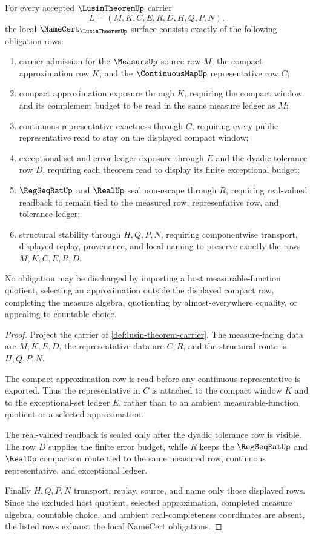 \begin{theorem}\label{thm:lusin-theorem-namecert-obligations}
For every accepted $\LusinTheoremUp$ carrier
$$
L=(M,K,C,E,R,D,H,Q,P,N),
$$
the local $\NameCert_{\LusinTheoremUp}$ surface consists exactly of the following obligation rows:
\begin{enumerate}
\item carrier admission for the $\MeasureUp$ source row $M$, the compact approximation row $K$, and the $\ContinuousMapUp$ representative row $C$;
\item compact approximation exposure through $K$, requiring the compact window and its complement budget to be read in the same measure ledger as $M$;
\item continuous representative exactness through $C$, requiring every public representative read to stay on the displayed compact window;
\item exceptional-set and error-ledger exposure through $E$ and the dyadic tolerance row $D$, requiring each theorem read to display its finite exceptional budget;
\item $\RegSeqRatUp$ and $\RealUp$ seal non-escape through $R$, requiring real-valued readback to remain tied to the measured row, representative row, and tolerance ledger;
\item structural stability through $H,Q,P,N$, requiring componentwise transport, displayed replay, provenance, and local naming to preserve exactly the rows $M,K,C,E,R,D$.
\end{enumerate}
No obligation may be discharged by importing a host measurable-function quotient, selecting an approximation outside the displayed compact row, completing the measure algebra, quotienting by almost-everywhere equality, or appealing to countable choice.
\end{theorem}
\begin{proof}
Project the carrier of \autoref{def:lusin-theorem-carrier}. The measure-facing data are $M,K,E,D$, the representative data are $C,R$, and the structural route is $H,Q,P,N$.

The compact approximation row is read before any continuous representative is exported. Thus the representative in $C$ is attached to the compact window $K$ and to the exceptional-set ledger $E$, rather than to an ambient measurable-function quotient or a selected approximation.

The real-valued readback is sealed only after the dyadic tolerance row is visible. The row $D$ supplies the finite error budget, while $R$ keeps the $\RegSeqRatUp$ and $\RealUp$ comparison route tied to the same measured row, continuous representative, and exceptional ledger.

Finally $H,Q,P,N$ transport, replay, source, and name only those displayed rows. Since the excluded host quotient, selected approximation, completed measure algebra, countable choice, and ambient real-completeness coordinates are absent, the listed rows exhaust the local NameCert obligations.
\end{proof}

